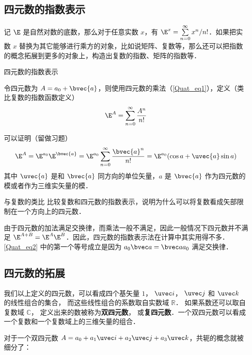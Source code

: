 \subsection{四元数的指数表示}

记 $\E$ 是自然对数的底数，那么对于任意实数 $x$，有 $\E^x = \sum^\infty\limits_{n=0} x^n / n!$．如果把实数 $x$ 替换为其它能够进行乘方的对象，比如说矩阵、复数等，那么还可以把指数的概念拓展到更多的对象上，构造出复数的指数、矩阵的指数等．

\begin{definition}{四元数的指数表示}

令四元数为 $A=a_0+\bvec{a}$，则使用四元数的乘法（\autoref{Quat_eq1}），定义（类比复数的指数函数定义）
\begin{equation}\label{Quat_eq2}
\E^A = \sum^\infty\limits_{n=0}\frac{A^n}{n!}
\end{equation}
\end{definition}
可以证明（留做习题）
\begin{equation}
\E^A = \E^{a_0}\E^{\bvec{a}}=\E^{a_0}\sum^\infty\limits_{n=0}\frac{\bvec{a}^n}{n!}=\E^{a_0}(\cos{a}+ \uvec{a}\sin a)
\end{equation}
其中 $\uvec{a}$ 是和 $\bvec{a}$ 同方向的单位矢量，$a$ 是 $\bvec{a}$ 作为四元数的模或者作为三维实矢量的模．

\begin{exercise}{与复数的类比}
比较复数和四元数的指数表示，说明为什么可以将复数看成矢部限制在一个方向上的四元数．
\end{exercise}

由于四元数的加法满足交换律，而乘法一般不满足，因此一般情况下四元数并不满足 $\E^{A+B} = \E^A \E^B$．因此，四元数的指数表示法在计算中其实用得不多． \autoref{Quat_eq2} 中的第一个等号成立是因为 $a_0\bvec a = \bvec a a_0$ 满足交换律．

\subsection{四元数的拓展}

我们以上定义的四元数，可以看成四个基矢量 $1$， $\uvec i$， $\uvec j$ 和 $\uvec k$ 的线性组合的集合， 而这些线性组合的系数取自实数域 $\mathbb R$． 如果系数还可以取自复数域 $\mathbb C$， 定义出来的数被称为\textbf{双四元数}， 或\textbf{复四元数}．一个双四元数可以看成一个复数和一个复数域上的三维矢量的组合．

对于一个双四元数 $A=a_0+a_1 \uvec i+a_2\uvec j+a_3\uvec k$，共轭的概念就被细分了：

